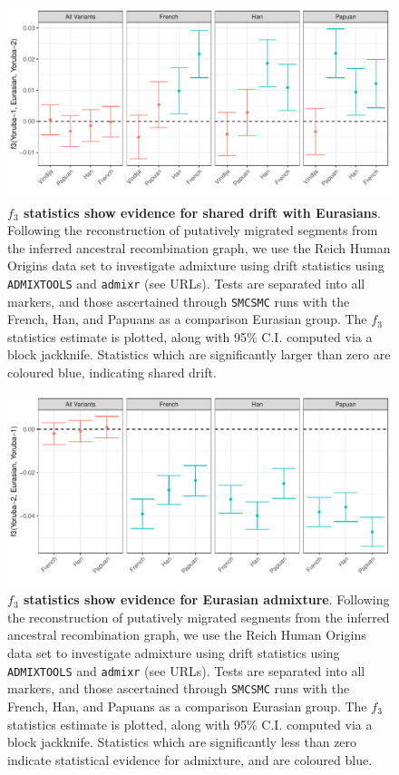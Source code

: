 \documentclass{article}
\begin{document}
\begin{figure}
    \centering
    \includegraphics[width = \textwidth]{plot/f3.pdf}
    \caption{ {\bf $f_3$ statistics show evidence for shared drift with Eurasians}. Following the reconstruction of putatively migrated segments from the inferred ancestral recombination graph, we use the Reich Human Origins data set to investigate admixture using drift statistics using {\tt ADMIXTOOLS} and {\tt admixr} (see URLs). Tests are separated into all markers, and those ascertained through {\tt SMCSMC} runs with the French, Han, and Papuans as a comparison Eurasian group. The $f_3$ statistics estimate is plotted, along with 95\% C.I. computed via a block jackknife. Statistics which are significantly larger than zero are coloured blue, indicating shared drift.}
    \label{fig:f3}
\end{figure}

\begin{figure}
    \centering
    \includegraphics[width=\textwidth]{plot/f3_admix.pdf}
    \caption{{\bf $f_3$ statistics show evidence for Eurasian admixture}. Following the reconstruction of putatively migrated segments from the inferred ancestral recombination graph, we use the Reich Human Origins data set to investigate admixture using drift statistics using {\tt ADMIXTOOLS} and {\tt admixr} (see URLs). Tests are separated into all markers, and those ascertained through {\tt SMCSMC} runs with the French, Han, and Papuans as a comparison Eurasian group. The $f_3$ statistics estimate is plotted, along with 95\% C.I. computed via a block jackknife. Statistics which are significantly less than zero indicate statistical evidence for admixture, and are coloured blue.}
    \label{fig:f3_admix}
\end{figure}
\end{document}
